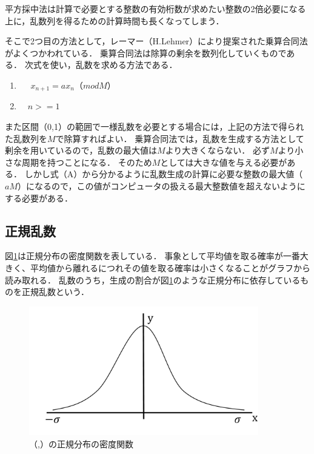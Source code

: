 \documentclass[12pt,a4j]{ltjsarticle}
\begin{document}
平方採中法は計算で必要とする整数の有効桁数が求めたい整数の2倍必要になる上に，乱数列を得るための計算時間も長くなってしまう．

そこで2つ目の方法として，レーマー（H.Lehmer）により提案された乗算合同法がよくつかわれている．
乗算合同法は除算の剰余を数列化していくものである．
次式を使い，乱数を求める方法である．
\begin{enumerate}[label=(\Alph*)]
	\item　 $x_{n+1} = ax_n（mod M）$
	\item　$n >= 1$
\end{enumerate} 

また区間（0,1）の範囲で一様乱数を必要とする場合には，上記の方法で得られた乱数列を$M$で除算すればよい．
乗算合同法では，乱数を生成する方法として剰余を用いているので，乱数の最大値は$M$より大きくならない．
必ず$M$より小さな周期を持つことになる．
そのため$M$としては大きな値を与える必要がある．
しかし式（A）から分かるように乱数生成の計算に必要な整数の最大値（$aM$）になるので，この値がコンピュータの扱える最大整数値を超えないようにする必要がある．

\clearpage

\subsection{正規乱数}
図\ref{fig:正規乱数}は正規分布の密度関数を表している．
事象として平均値を取る確率が一番大きく、平均値から離れるにつれその値を取る確率は小さくなることがグラフから読み取れる．
乱数のうち，生成の割合が図\ref{fig:正規乱数}のような正規分布に依存しているものを正規乱数という．
\vspace{8mm}
\begin{figure}[h]
\begin{center}
\includegraphics[width = 100mm ] {figures/seikir.pdf}
\caption{（\mu,\sigma）の正規分布の密度関数}
\label{fig:正規乱数}
\end{center}
\end{figure}
\end{document}
